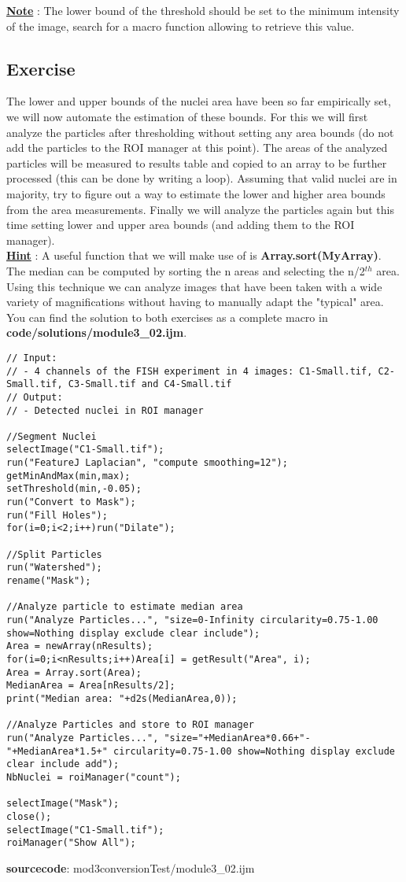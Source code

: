 \textbf{\underline{Note}} : The lower bound of the threshold should be set to the minimum intensity of the image, search for a macro function allowing to retrieve this value.

\subsection{Exercise }

The lower and upper bounds of the nuclei area have been so far empirically set, we will now automate the estimation of these bounds. For this we will first analyze the particles after thresholding without setting any area bounds (do not add the particles to the ROI manager at this point). The areas of the analyzed particles will be measured to results table and copied to an array to be further processed (this can be done by writing a loop). Assuming that valid nuclei are in majority, try to figure out a way to estimate the lower and higher area bounds from the area measurements. Finally we will analyze the particles again but this time setting lower and upper area bounds (and adding them to the ROI manager).\\

\textbf{\underline{Hint}} : A useful function that we will make use of is \textbf{Array.sort(MyArray)}. The median can be computed by sorting the n areas and selecting the n/2$^{th}$ area.\\

Using this technique we can analyze images that have been taken with a wide variety of magnifications without having to manually adapt the "typical" area. You can find the solution to both exercises as a complete macro in \textbf{code/solutions/module3\_02.ijm}.


\begin{lstlisting}[linerange={1-4}]
// Input: 
// - 4 channels of the FISH experiment in 4 images: C1-Small.tif, C2-Small.tif, C3-Small.tif and C4-Small.tif
// Output: 
// - Detected nuclei in ROI manager

//Segment Nuclei
selectImage("C1-Small.tif");
run("FeatureJ Laplacian", "compute smoothing=12");
getMinAndMax(min,max);
setThreshold(min,-0.05);
run("Convert to Mask");
run("Fill Holes");
for(i=0;i<2;i++)run("Dilate");

//Split Particles
run("Watershed");
rename("Mask");

//Analyze particle to estimate median area
run("Analyze Particles...", "size=0-Infinity circularity=0.75-1.00 show=Nothing display exclude clear include"); 
Area = newArray(nResults);
for(i=0;i<nResults;i++)Area[i] = getResult("Area", i);
Area = Array.sort(Area);
MedianArea = Area[nResults/2];
print("Median area: "+d2s(MedianArea,0));

//Analyze Particles and store to ROI manager
run("Analyze Particles...", "size="+MedianArea*0.66+"-"+MedianArea*1.5+" circularity=0.75-1.00 show=Nothing display exclude clear include add");
NbNuclei = roiManager("count");

selectImage("Mask");
close();
selectImage("C1-Small.tif");
roiManager("Show All");
\end{lstlisting}
\textbf{sourcecode}: mod3conversionTest/module3_02.ijm


